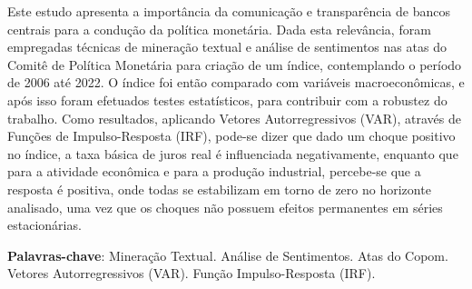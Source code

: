 
\setlength{\absparsep}{18pt} %
\begin{resumo}

Este estudo apresenta a importância da comunicação e transparência de bancos centrais para a condução da política monetária. Dada esta relevância, foram empregadas técnicas de mineração textual e análise de sentimentos nas atas do Comitê de Política Monetária para criação de um índice, contemplando o período de 2006 até 2022. O índice foi então comparado com variáveis macroeconômicas, e após isso foram efetuados testes estatísticos, para contribuir com a robustez do  trabalho. Como resultados, aplicando Vetores Autorregressivos (VAR), através de Funções de Impulso-Resposta (IRF), pode-se dizer que dado um choque positivo no índice, a taxa básica de juros real é influenciada negativamente, enquanto que para a atividade econômica e para a produção industrial, percebe-se que a resposta é positiva, onde todas se estabilizam em torno de zero no horizonte analisado, uma vez que os choques não possuem efeitos permanentes em séries estacionárias. 


 \textbf{Palavras-chave}: Mineração Textual. Análise de Sentimentos. Atas do Copom. Vetores Autorregressivos (VAR). Função Impulso-Resposta (IRF).
\end{resumo}
